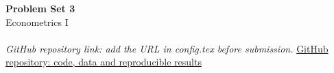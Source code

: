 \documentclass[11pt,a4paper]{article}
\begin{document}
\begin{center}
{\LARGE\bfseries Problem Set 3}\\[6pt]
{\large Econometrics I}\\[5pt]
\SubmissionName\\[5pt]
\ifdefempty{\RepositoryURL}
{\textit{GitHub repository link: add the URL in config.tex before submission.}}
{\href{\RepositoryURL}{GitHub repository: code, data and reproducible results}}
\end{center}
\vspace{4pt}

\clearpage

\clearpage

\clearpage

\clearpage

\end{document}
